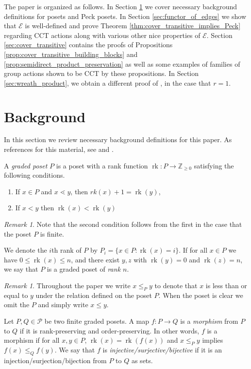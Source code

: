 \documentclass[smallextended, envcountsame, numbook]{svjour3}
\theoremstyle{plain}
\theoremstyle{definition}
\theoremstyle{remark}
\newtheorem{rmk}[thm]{Remark}
\numberwithin{equation}{section}
\newcommand\rk{\operatorname{rk}}
\begin{document}
The paper is organized as follows. In Section \ref{sec:background} we cover necessary background definitions for posets and Peck posets.  In Section \ref{sec:functor_of_edges} we show that $\mathcal E$ is well-defined and prove Theorem \ref{thm:cover_transitive_implies_Peck} regarding CCT actions along with various other nice properties of $\mathcal E$. Section \ref{sec:cover_transitive} contains the proofs of Propositions \ref{prop:cover_transitive_building_blocks} and \ref{prop:semidirect_product_preservation} as well as some examples of families of group actions shown to be CCT by these propositions. In Section \ref{sec:wreath_product}, we obtain a different proof of \cite[Theorem 1.1]{pak}, in the case that $r = 1$.








\section{Background}\label{sec:background}

In this section we review necessary background definitions for this paper.
As references for this material, see
\cite[Chapter 4]{stanley_alg_comb} and \cite{quotients_stanley}.


A {\it graded poset} $P$ is a poset with a rank function $\rk\colon P \rightarrow \mathbb Z_{\geq 0}$ satisfying the following conditions.
\begin{enumerate}
  \item If $x\in P$ and $x\lessdot y$, then $rk(x) + 1 = \rk(y)$,
  \item If $x < y$ then $\rk(x) < \rk(y)$ 
\end{enumerate}

\begin{rmk}
Note that the second condition follows from the first in the case that the poset $P$ is finite.
\end{rmk}

We denote the $i$th rank of $P$ by  $P_i = \{x \in P\colon\rk(x) = i\}$.  If for all $x\in P$ we have $0 \leq \rk(x) \leq n$, and there exist $y,z$ with $\rk(y) = 0$ and $\rk(z) = n$, we say that $P$ is a graded poset of {\it rank $n$}.

\begin{rmk}
Throughout the paper we write $x\le_P y$ to denote that $x$ is less than or equal to $y$ under the relation defined on the poset $P$.  When the poset is clear we omit the $P$ and simply write $x\le y$.  
\end{rmk}
Let $P, Q \in \mathcal P$ be two finite graded posets.  A map $f\colon P\rightarrow Q$ is a \textit{morphism} from $P$ to $Q$ if it is rank-preserving and order-preserving.  In other words, $f$ is a morphism if for all $x,y\in P$, $\rk(x) = \rk(f(x))$ and $x\le_P y $ implies $f(x)\le_Q f(y)$.  We say that $f$ is \textit{injective/surjective/bijective} if it is an injection/surjection/bijection from $P$ to $Q$ as sets.
\end{document}

